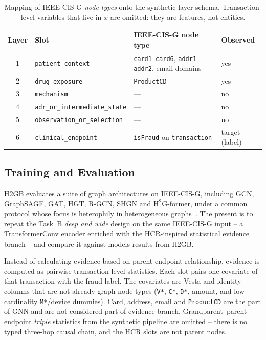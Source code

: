 \begin{table}[H]
  \centering
  \small
  \caption{Mapping of IEEE-CIS-G \emph{node types} onto the synthetic layer schema.
    Transaction-level variables that live in $x$ are omitted: they are features,
    not entities.}
  \label{tab:ieee-cis-mapping}
  \begin{tabular}{clll}
    \toprule
    Layer & Slot & IEEE-CIS-G node type & Observed \\
    \midrule
    1 & \texttt{patient\_context}            & \texttt{card1}--\texttt{card6}, \texttt{addr1}--\texttt{addr2}, email domains & yes \\
    2 & \texttt{drug\_exposure}              & \texttt{ProductCD} & yes \\
    3 & \texttt{mechanism}                   & --- & no \\
    4 & \texttt{adr\_or\_intermediate\_state} & --- & no \\
    5 & \texttt{observation\_or\_selection}  & --- & no \\
    6 & \texttt{clinical\_endpoint}          & \texttt{isFraud} on \texttt{transaction} & target (label) \\
    \bottomrule
  \end{tabular}
\end{table}

\subsection{Training and Evaluation}
\label{sec:ieee-protocol}

H2GB evaluates a suite of graph architectures on IEEE-CIS-G, including
GCN, GraphSAGE, GAT, HGT, R-GCN, SHGN and $\mathrm{H}^{2}$G-former, under a
common protocol whose focus is heterophily in heterogeneous graphs~\cite{lin2025h2gb}.
The present is to repeat the Task~B \emph{deep and wide} design on the same IEEE-CIS-G
input -- a TransformerConv encoder enriched with the
HCR-inspired statistical evidence branch -- and compare it against models results from H2GB.

Instead of calculating evidence based on parent-endpoint relationship, evidence is
computed as pairwise transaction-level statistics. Each slot pairs one
covariate of that transaction with the fraud label.
The covariates are Vesta and identity columns that are not already graph node
types (\texttt{V*}, \texttt{C*}, \texttt{D*}, amount, and low-cardinality
\texttt{M*}/device dummies).
Card, address, email and \texttt{ProductCD} are the part of GNN and are not considered part of
evidence branch.
Grandparent--parent--endpoint \emph{triple} statistics from the synthetic
pipeline are omitted -- there is no typed three-hop causal chain, and the
HCR slots are not parent nodes.

